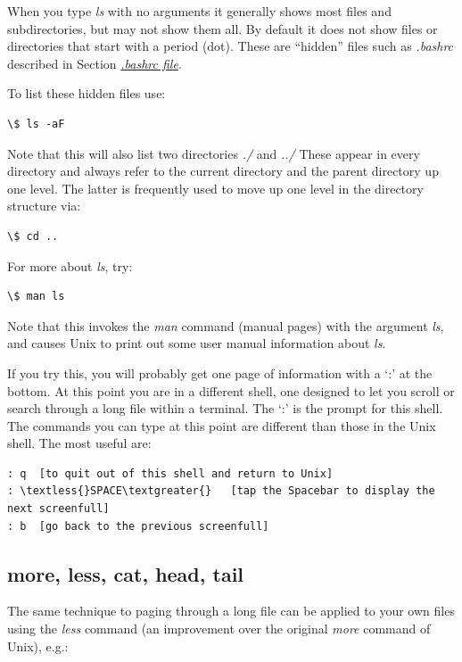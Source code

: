 \documentclass[letterpaper,10pt,english]{sphinxmanual}
\begin{document}
When you type \emph{ls} with no arguments it generally shows most files and
subdirectories, but may not show them all.  By default it does not show
files or directories that start with a period (dot).  These are ``hidden''
files such as \emph{.bashrc} described in Section {\hyperref[unix:bashrc]{\emph{.bashrc file}}}.

To list these hidden files use:

\begin{Verbatim}[commandchars=\\\{\}]
\$ ls -aF
\end{Verbatim}

Note that this will also list two directories \emph{./} and \emph{../}  These appear
in every directory and always refer to the current directory and the parent
directory up one level.  The latter is frequently used to move up one level
in the directory structure via:

\begin{Verbatim}[commandchars=\\\{\}]
\$ cd ..
\end{Verbatim}

For more about \emph{ls}, try:

\begin{Verbatim}[commandchars=\\\{\}]
\$ man ls
\end{Verbatim}

Note that this invokes the \emph{man} command (manual pages) with the argument
\emph{ls}, and causes Unix to print out some user manual information about \emph{ls}.

If you try this, you will probably get one page of information with a `:' at
the bottom.  At this point you are in a different shell, one designed to
let you scroll or search through a long file within a terminal.  The `:' is
the prompt for this shell.  The commands you can type at this point are
different than those in the Unix shell.  The most useful are:

\begin{Verbatim}[commandchars=\\\{\}]
: q  [to quit out of this shell and return to Unix]
: \textless{}SPACE\textgreater{}   [tap the Spacebar to display the next screenfull]
: b  [go back to the previous screenfull]
\end{Verbatim}


\subsection{more, less, cat, head, tail}
\label{unix:more-less-cat-head-tail}
The same technique to paging through a long file can be applied to your own
files using the \emph{less} command (an improvement over the original \emph{more}
command of Unix), e.g.:
\end{document}
